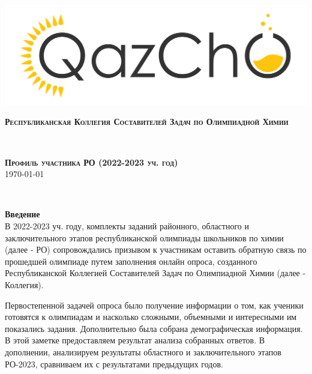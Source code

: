 \documentclass[12pt,openany]{extbook}
\begin{document}
\begin{titlepage}


\newcommand{\HRule}{\rule{\linewidth}{0.5mm}} %

\center %

\includegraphics[width=0.5\linewidth]{logo_color.jpg}\\[1.0cm]


\begin{minipage}{0.5\textwidth}
\begin{flushleft} \large
\textsc{\textbf{Республиканская Коллегия Составителей Задач по Олимпиадной Химии}}
\end{flushleft}
\end{minipage}
~
\begin{minipage}{0.4\textwidth}
\begin{flushright} \large
\textsc{\textbf{Профиль участника РО (2022-2023 уч. год)}}\\
\textsc{\today}
\end{flushright}
\end{minipage}\\[2.0cm]

\begin{minipage}{0.93\textwidth}
\begin{flushleft}
  

\textbf{\large Введение}\\[0.5cm]
В 2022-2023 уч. году, комплекты заданий районного, областного и заключительного этапов республиканской олимпиады школьников по химии (далее - РО) сопровождались призывом к участникам оставить обратную связь по прошедшей олимпиаде путем заполнения онлайн опроса, созданного Республиканской Коллегией Составителей Задач по Олимпиадной Химии (далее - Коллегия). 
\vspace{0.5em}

Первостепенной задачей опроса было получение информации о том, как ученики готовятся к олимпиадам и насколько сложными, объемными и интересными им показались задания. Дополнительно была собрана демографическая информация. В этой заметке предоставляем результат анализа собранных ответов. В дополнении, анализируем результаты областного и заключительного этапов РО-2023, сравниваем их с результатами предыдущих годов.
\vspace{0.5em}


\end{flushleft}
\end{minipage}
\end{titlepage}
\end{document}
